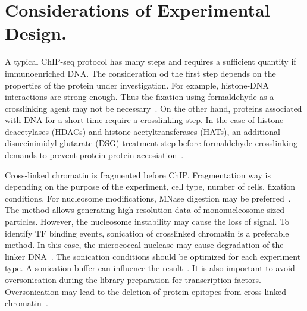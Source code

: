 





\section{Considerations of Experimental Design.}


A typical ChIP-seq protocol has many steps and requires a sufficient quantity if immunoenriched DNA. 
The consideration od the first step depends on the properties of the protein under investigation. 
For example, histone-DNA interactions are strong enough. 
Thus the fixation using formaldehyde as a crosslinking agent may not be necessary~\cite{barski2008identification}. 
On the other hand, proteins associated with DNA for a short time require a crosslinking step. 
In the case of histone deacetylases (HDACs) and histone acetyltransferases (HATs), an additional disuccinimidyl glutarate (DSG) treatment step before formaldehyde crosslinking demands to prevent protein-protein accosiation~\cite{wang2009genome}. 

Cross-linked chromatin is fragmented before ChIP. 
Fragmentation way is depending on the purpose of the experiment, cell type, number of cells, fixation conditions. 
For nucleosome modifications, MNase digestion may be preferred~\cite{kidder2011chip}.  
The method allows generating high-resolution data of mononucleosome sized particles. 
However, the nucleosome instability may cause the loss of signal.
To identify TF binding events, sonication of crosslinked chromatin is a preferable method. 
In this case, the micrococcal nuclease may cause degradation of the linker DNA~\cite{kidder2011chip}.
The sonication conditions should be optimized for each experiment type. 
A sonication buffer can influence the result~\cite{steger2008dot1l}. 
It is also important to avoid oversonication during the library preparation for transcription factors. 
Oversonication may lead to the deletion of protein epitopes from cross-linked chromatin~\cite{ostrow2015chip}. 

